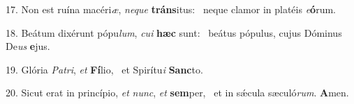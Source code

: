 17. Non est ruína macéri\textit{æ}, \textit{ne}\textit{que} \textbf{tráns}itus: \ast\  neque clamor in platéis \textit{e}\textbf{ó}rum.\

18. Beátum dixérunt pópu\textit{lum}, \textit{cu}\textit{i} \textbf{hæc} sunt: \ast\  beátus pópulus, cujus Dóminus De\textit{us} \textbf{e}jus.\

19. Glória \textit{Pa}\textit{tri}, \textit{et} \textbf{Fí}lio, \ast\  et Spirítu\textit{i} \textbf{Sanc}to.\

20. Sicut erat in princípio, \textit{et} \textit{nunc}, \textit{et} \textbf{sem}per, \ast\  et in sǽcula sæculó\textit{rum}. \textbf{A}men.\

